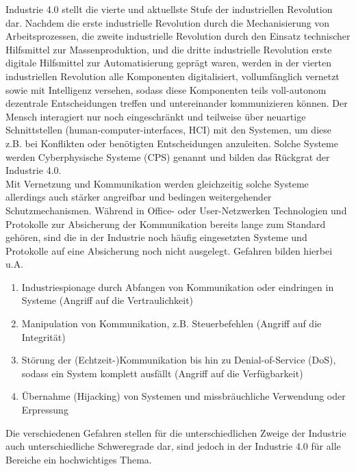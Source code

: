 \documentclass[conference]{IEEEtran}
\begin{document}
Industrie 4.0 stellt die vierte und aktuellste Stufe der industriellen Revolution dar. Nachdem die erste industrielle Revolution durch die Mechanisierung von Arbeitsprozessen, die zweite industrielle Revolution durch den Einsatz technischer Hilfsmittel zur Massenproduktion, und die dritte industrielle Revolution erste digitale Hilfsmittel zur Automatisierung geprägt waren, werden in der vierten industriellen Revolution alle Komponenten digitalisiert, vollumfänglich vernetzt sowie mit Intelligenz versehen, sodass diese Komponenten teils voll-autonom dezentrale Entscheidungen treffen und untereinander kommunizieren können. Der Mensch interagiert nur noch eingeschränkt und teilweise über neuartige Schnittstellen (human-computer-interfaces, HCI) mit den Systemen, um diese z.B. bei Konflikten oder benötigten Entscheidungen anzuleiten. Solche Systeme werden Cyberphysische Systeme (CPS) genannt und bilden das Rückgrat der Industrie 4.0. \cite{botthof2015zukunft}\\

Mit Vernetzung und Kommunikation werden gleichzeitig solche Systeme allerdings auch stärker angreifbar und bedingen weitergehender Schutzmechanismen. Während in Office- oder User-Netzwerken Technologien und Protokolle zur Absicherung der Kommunikation bereits lange zum Standard gehören, sind die in der Industrie noch häufig eingesetzten Systeme und Protokolle auf eine Absicherung noch nicht ausgelegt. Gefahren bilden hierbei u.A.

\vspace{.5em}

\renewcommand{\labelenumi}{\alph{enumi})}
\begin{enumerate}
	\item Industriespionage durch Abfangen von Kommunikation oder eindringen in Systeme (Angriff auf die Vertraulichkeit)
	\item Manipulation von Kommunikation, z.B. Steuerbefehlen (Angriff auf die Integrität)
	\item Störung der (Echtzeit-)Kommunikation bis hin zu Denial-of-Service (DoS), sodass ein System komplett ausfällt (Angriff auf die Verfügbarkeit)
	\item Übernahme (Hijacking) von Systemen und missbräuchliche Verwendung oder Erpressung
\end{enumerate}

\vspace{.5em}

Die verschiedenen Gefahren stellen für die unterschiedlichen Zweige der Industrie auch unterschiedliche Schweregrade dar, sind jedoch in der Industrie 4.0 für alle Bereiche ein hochwichtiges Thema.\\
\end{document}
